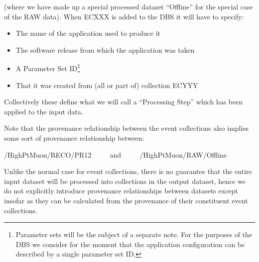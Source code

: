 \documentclass[pdftex]{cmspaper}
\begin{document}
(where we have made up a special processed dataset ``Offline'' for the
special case of the RAW data). When ECXXX is added to the DBS it will
have to specify:
\begin{itemize}
\item The name of the application used to produce it
\item The software release from which the application was taken
\item A Parameter Set ID\footnote{Parameter sets will be the subject of
a separate note. For the purposes of the DBS we consider for the moment
that the application configuration can be described by a single parameter
set ID.}
\item That it was created from (all or part of) collection ECYYY
\end{itemize}
Collectively these define what we will call a ``Processing Step'' which has
been applied to the input data.

  Note that the provenance relationship between the event collections also
implies some sort of provenance relationship between:

\begin{center}
/HighPtMuon/RECO/PR12 ~~~~ and ~~~~ /HighPtMuon/RAW/Offline
\end{center}
   
Unlike the normal case for event collections, there is no guarantee that 
the entire input dataset will be processed into collections in the output
dataset, hence we do not explicitly introduce provenance relationships between
datasets except insofar as they can be calculated from the provenance of
their constituent event collections.

%

\end{document}
